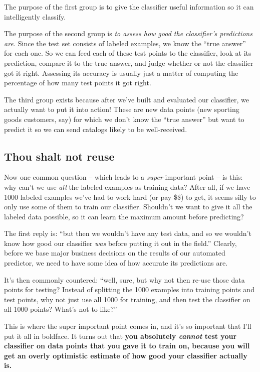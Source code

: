 The purpose of the first group is to give the classifier useful information so
it can intelligently classify.

The purpose of the second group is \textit{to assess how good the classifier's
predictions are.} Since the test set consists of labeled examples, we know the
``true answer'' for each one. So we can feed each of these test points to the
classifier, look at its prediction, compare it to the true answer, and judge
whether or not the classifier got it right. Assessing its accuracy is usually
just a matter of computing the percentage of how many test points it got right.

The third group exists because after we've built and evaluated our classifier,
we actually want to put it into action! These are new data points (new sporting
goods customers, say) for which we don't know the ``true answer'' but want to
predict it so we can send catalogs likely to be well-received.

\subsection{Thou shalt not reuse}

\label{cantTestOnTrainingData}

Now one common question -- which leads to a \textit{super} important point --
is this: why can't we use \textit{all} the labeled examples as training data?
After all, if we have 1000 labeled examples we've had to work hard (or pay
\$\$) to get, it seems silly to only use some of them to train our classifier.
Shouldn't we want to give it all the labeled data possible, so it can learn the
maximum amount before predicting?

The first reply is: ``but then we wouldn't have any test data, and so we
wouldn't know how good our classifier \textit{was} before putting it out in the
field.'' Clearly, before we base major business decisions on the results of our
automated predictor, we need to have some idea of how accurate its predictions
are.

It's then commonly countered: ``well, sure, but why not then re-use those data
points for testing? Instead of splitting the 1000 examples into training points
and test points, why not just use all 1000 for training, and then test the
classifier on all 1000 points? What's not to like?''

This is where the super important point comes in, and it's so important that
I'll put it all in boldface. It turns out that \textbf{you absolutely
\textit{cannot} test your classifier on data points that you gave it to train
on, because you will get an overly optimistic estimate of how good your
classifier actually is.}

